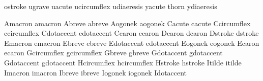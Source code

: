  ostroke       {}
 ugrave        {}
 uacute        {}
 ucircumflex   {}
 udiaeresis    {}
 yacute        {}
 thorn         {}
 ydiaeresis    {}

 Amacron       {}
 amacron       {}
 Abreve        {}
 abreve        {}
 Aogonek       {}
 aogonek       {}
 Cacute        {}
 cacute        {}
 Ccircumflex   {}
 ccircumflex   {}
 Cdotaccent    {}
 cdotaccent    {}
 Ccaron        {}
 ccaron        {}
 Dcaron        {}
 dcaron        {}
 Dstroke       {}
 dstroke       {}
 Emacron       {}
 emacron       {}
 Ebreve        {}
 ebreve        {}
 Edotaccent    {}
 edotaccent    {}
 Eogonek       {}
 eogonek       {}
 Ecaron        {}
 ecaron        {}
 Gcircumflex   {}
 gcircumflex   {}
 Gbreve        {}
 gbreve        {}
 Gdotaccent    {}
 gdotaccent    {}
 Gdotaccent    {}
 gdotaccent    {}
 Hcircumflex   {}
 hcircumflex   {}
 Hstroke       {}
 hstroke       {}
 Itilde        {}
 itilde        {}
 Imacron       {}
 imacron       {}
 Ibreve        {}
 ibreve        {}
 Iogonek       {}
 iogonek       {}
 Idotaccent    {}
